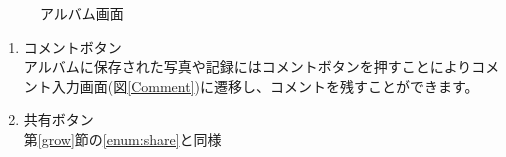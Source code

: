 \documentclass[a4j]{jarticle}
\begin{document}
\begin{figure}[H]
    \begin{center}
    \caption {アルバム画面}
    \label{Albam}
    \end{center}
\end{figure}

\begin{enumerate}
  \renewcommand{\labelenumi}{\textcircled{\scriptsize \theenumi}}
  \item コメントボタン\\
    アルバムに保存された写真や記録にはコメントボタンを押すことによりコメント入力画面(図\ref{Comment})に遷移し、コメントを残すことができます。
  \item 共有ボタン\\
        第\ref{grow}節の\ref{enum:share}と同様
\end{enumerate}
\end{document}
